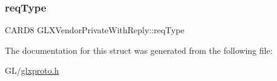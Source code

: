 \subsubsection{\texorpdfstring{req\+Type}{reqType}}
{\footnotesize\ttfamily C\+A\+R\+D8 G\+L\+X\+Vendor\+Private\+With\+Reply\+::req\+Type}



The documentation for this struct was generated from the following file\+:\begin{DoxyCompactItemize}
\item 
G\+L/\hyperlink{glxproto_8h}{glxproto.\+h}\end{DoxyCompactItemize}
